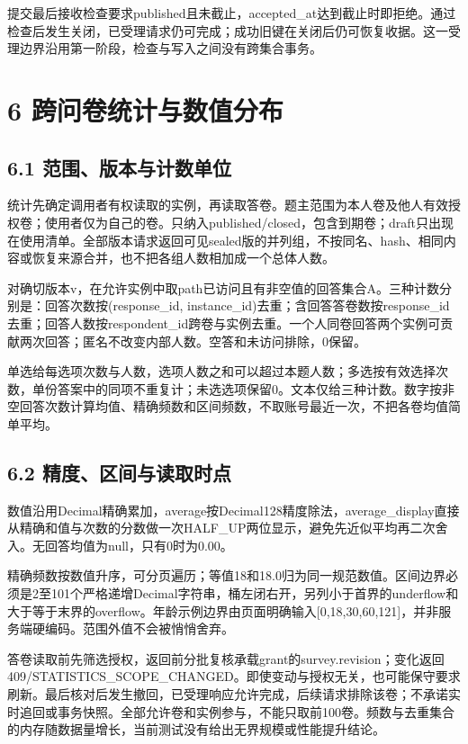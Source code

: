提交最后接收检查要求published且未截止，accepted\_at达到截止时即拒绝。通过检查后发生关闭，已受理请求仍可完成；成功旧键在关闭后仍可恢复收据。这一受理边界沿用第一阶段，检查与写入之间没有跨集合事务。

\section{6 跨问卷统计与数值分布}\label{ux8de8ux95eeux5377ux7edfux8ba1ux4e0eux6570ux503cux5206ux5e03}

\subsection{6.1 范围、版本与计数单位}\label{ux8303ux56f4ux7248ux672cux4e0eux8ba1ux6570ux5355ux4f4d}

统计先确定调用者有权读取的实例，再读取答卷。题主范围为本人卷及他人有效授权卷；使用者仅为自己的卷。只纳入published/closed，包含到期卷；draft只出现在使用清单。全部版本请求返回可见sealed版的并列组，不按同名、hash、相同内容或恢复来源合并，也不把各组人数相加成一个总体人数。

对确切版本v，在允许实例中取path已访问且有非空值的回答集合A。三种计数分别是：回答次数按(response\_id, instance\_id)去重；含回答答卷数按response\_id去重；回答人数按respondent\_id跨卷与实例去重。一个人同卷回答两个实例可贡献两次回答；匿名不改变内部人数。空答和未访问排除，0保留。

单选给每选项次数与人数，选项人数之和可以超过本题人数；多选按有效选择次数，单份答案中的同项不重复计；未选选项保留0。文本仅给三种计数。数字按非空回答次数计算均值、精确频数和区间频数，不取账号最近一次，不把各卷均值简单平均。

\subsection{6.2 精度、区间与读取时点}\label{ux7cbeux5ea6ux533aux95f4ux4e0eux8bfbux53d6ux65f6ux70b9}

数值沿用Decimal精确累加，average按Decimal128精度除法，average\_display直接从精确和值与次数的分数做一次HALF\_UP两位显示，避免先近似平均再二次舍入。无回答均值为null，只有0时为0.00。

精确频数按数值升序，可分页遍历；等值18和18.0归为同一规范数值。区间边界必须是2至101个严格递增Decimal字符串，桶左闭右开，另列小于首界的underflow和大于等于末界的overflow。年龄示例边界由页面明确输入{[}0,18,30,60,121{]}，并非服务端硬编码。范围外值不会被悄悄舍弃。

答卷读取前先筛选授权，返回前分批复核承载grant的survey.revision；变化返回409/STATISTICS\_SCOPE\_CHANGED。即使变动与授权无关，也可能保守要求刷新。最后核对后发生撤回，已受理响应允许完成，后续请求排除该卷；不承诺实时追回或事务快照。全部允许卷和实例参与，不能只取前100卷。频数与去重集合的内存随数据量增长，当前测试没有给出无界规模或性能提升结论。

